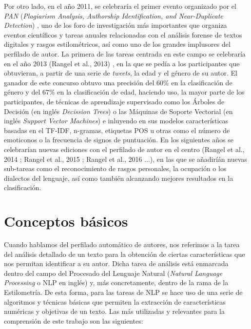 \bigskip
Por otro lado, en el año 2011, se celebraría el primer evento organizado por el \textit{PAN} (\textit{Plagiarism Analysis, Authorship Identification, and Near-Duplicate Detection}) \cite{pan},
uno de los foro de investigación más importantes que organiza eventos científicos y tareas anuales relacionadas con el análisis forense de textos digitales
y rasgos estilométricos, así como uno de los grandes implusores del perfilado de autor. La primera de las tareas centrada en este campo se celebraría en el año 2013 (Rangel et al., 2013) \cite{rangel2013overview},
en la que se pedía a los participantes que obtuvieran, a partir de una serie de \textit{tweets}, la edad y el género de su autor. El ganador de este concurso obtuvo una
precisión del 60\% en la clasificación de género y del 67\% en la clasificación de edad, haciendo uso, la mayor parte de los participantes, de técnicas de aprendizaje
supervisado como los Árboles de Decisión (en inglés \textit{Decission Trees}) o las Máquinas de Soporte Vectorial (en inglés \textit{Support Vector Machines}) e inluyendo
en sus modelos características basadas en el TF-IDF, n-gramas, etiquetas POS u otras como el número de emoticonos o la frecuencia de signos de puntuación.
En los siguientes años se celebrarían nuevas ediciones con el perfilado de autor en el centro (Rangel et al., 2014 \cite{rangel2014overview}; Rangel et al., 2015 \cite{rangel2015overview};
Rangel et al., 2016 \cite{rangel2016overview}...), en las que se añadiríán nuevas sub-tareas como el reconocimiento de rasgos personales, la ocupación o los dialectos del lenguaje,
así como también alcanzando mejores resultados en la clasificación.

\section{Conceptos básicos}

Cuando hablamos del perfilado automático de autores, nos referimos a la tarea del análisis detallado de un texto para la obtención de ciertas características
que nos permitan identificar a su autor.
Dicha tarea de análisis está enmarcada dentro del campo del Procesado del Lenguaje Natural (\textit{Natural Language Processing} o NLP en inglés) y, más concretamente,
dentro de la rama de la Estilometría. De esta forma, para las tareas de NLP se hace uso
de una serie de algoritmos y técnicas básicas que permiten la extracción de características numéricas y objetivas de un texto. Las más utilizadas y relevantes
para la comprensión de este trabajo son las siguientes:

